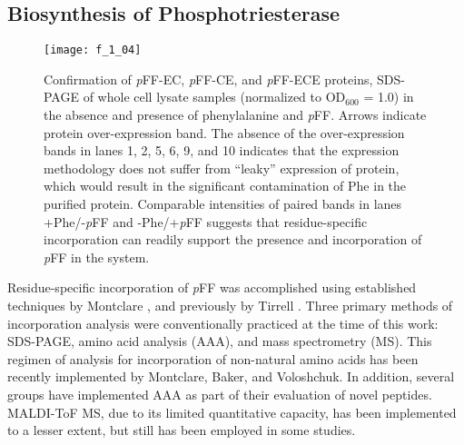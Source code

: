 \begin{refsection}
\subsection{Biosynthesis of Phosphotriesterase}
\label{sec:biosynthesis_results}
\begin{figure}[h!] \centering \texttt{[image: f\_1\_04]}
    \caption[Confirmation of
        \emph{p}FF-EC, \emph{p}FF-CE, and \emph{p}FF-ECE proteins, SDS-PAGE of
        whole cell lysate samples (normalized to OD{$_{600}$} = 1.0) in the
        absence and presence of phenylalanine and \emph{p}FF. Arrows indicate
        protein over-expression band. The absence of the over-expression bands
        in lanes 1, 2, 5, 6, 9, and 10 indicates that the expression methodology
        does not suffer from ``leaky'' expression of protein, which would result
        in the significant contamination of Phe in the purified protein.
        Comparable intensities of paired bands in lanes +Phe/-\emph{p}FF and
        -Phe/+\emph{p}FF suggests that residue-specific incorporation can
        readily support the presence and incorporation of \emph{p}FF in the
    system.] {Confirmation of
        \emph{p}FF-EC, \emph{p}FF-CE, and \emph{p}FF-ECE proteins, SDS-PAGE of
        whole cell lysate samples (normalized to OD{$_{600}$} = 1.0) in the
        absence and presence of phenylalanine and \emph{p}FF. Arrows indicate
        protein over-expression band. The absence of the over-expression bands
        in lanes 1, 2, 5, 6, 9, and 10 indicates that the expression methodology
        does not suffer from ``leaky'' expression of protein, which would result
        in the significant contamination of Phe in the purified protein.
        Comparable intensities of paired bands in lanes +Phe/-\emph{p}FF and
        -Phe/+\emph{p}FF suggests that residue-specific incorporation can
        readily support the presence and incorporation of \emph{p}FF in the
    system.}
        \label{fig:expression_gel_pFF} \end{figure}
Residue-specific incorporation of \emph{p}FF was accomplished using 
established techniques by Montclare , and previously by Tirrell
.\cite{Yoshikawa1994,Sharma2000,Voloshchuk2009} Three primary methods of
incorporation analysis were conventionally practiced at the time of this work:
SDS-PAGE, amino acid analysis (AAA), and mass spectrometry (MS). 
This regimen of analysis for incorporation of non-natural amino acids has been
recently implemented by Montclare, Baker, and
Voloshchuk\cite{Voloshchuk2009,Panchenko2006,Baker2011}. In
addition, several groups have implemented AAA as part of their evaluation of novel
peptides. MALDI-ToF MS, due to its limited quantitative capacity, has been
implemented to a lesser extent, but still has been employed in some
studies.\cite{Taki2001}


\end{refsection}
